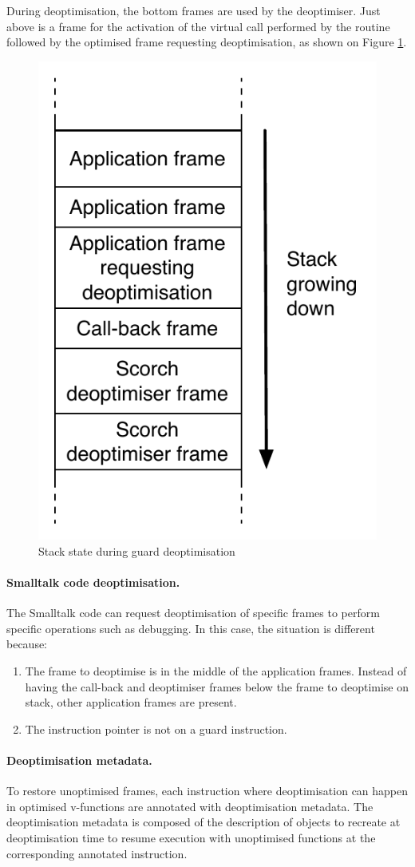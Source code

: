 \documentclass[a4paper,12pt,twoside]{../includes/ThesisStyle}
\begin{document}
During deoptimisation, the bottom frames are used by the deoptimiser. Just above is a frame for the activation of the virtual call performed by the routine followed by the optimised frame requesting deoptimisation, as shown on Figure \ref{fig:DeoptCallBackStack}.

\begin{figure}[h!]
    \begin{center}
        \includegraphics[width=0.4\linewidth]{DeoptCallBackStack}
        \caption{Stack state during guard deoptimisation}
        \label{fig:DeoptCallBackStack}
    \end{center}
\end{figure}


\paragraph{Smalltalk code deoptimisation.}The Smalltalk code can request deoptimisation of specific frames to perform specific operations such as debugging. In this case, the situation is different because:
\begin{enumerate}
	\item The frame to deoptimise is in the middle of the application frames. Instead of having the call-back and deoptimiser frames below the frame to deoptimise on stack, other application frames are present.
	\item The instruction pointer is not on a guard instruction.
\end{enumerate}

\paragraph{Deoptimisation metadata.} To restore unoptimised frames, each instruction where deoptimisation can happen in optimised v-functions are annotated with deoptimisation metadata. The deoptimisation metadata is composed of the description of objects to recreate at deoptimisation time to resume execution with unoptimised functions at the corresponding annotated instruction. 
\end{document}
